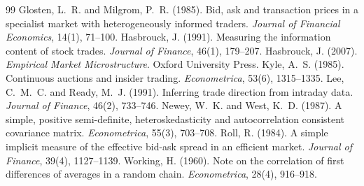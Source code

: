 \documentclass[11pt,a4paper]{article}
\begin{document}
\begin{thebibliography}{99}
 Glosten, L.~R. and Milgrom, P.~R. (1985). Bid, ask and transaction prices in a specialist market with heterogeneously informed traders. \emph{Journal of Financial Economics}, 14(1), 71--100.
 Hasbrouck, J. (1991). Measuring the information content of stock trades. \emph{Journal of Finance}, 46(1), 179--207.
 Hasbrouck, J. (2007). \emph{Empirical Market Microstructure}. Oxford University Press.
 Kyle, A.~S. (1985). Continuous auctions and insider trading. \emph{Econometrica}, 53(6), 1315--1335.
 Lee, C.~M.~C. and Ready, M.~J. (1991). Inferring trade direction from intraday data. \emph{Journal of Finance}, 46(2), 733--746.
 Newey, W.~K. and West, K.~D. (1987). A simple, positive semi-definite, heteroskedasticity and autocorrelation consistent covariance matrix. \emph{Econometrica}, 55(3), 703--708.
 Roll, R. (1984). A simple implicit measure of the effective bid-ask spread in an efficient market. \emph{Journal of Finance}, 39(4), 1127--1139.
 Working, H. (1960). Note on the correlation of first differences of averages in a random chain. \emph{Econometrica}, 28(4), 916--918.
\end{thebibliography}
\end{document}
